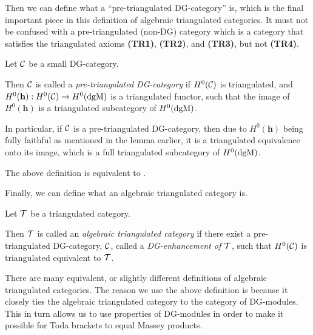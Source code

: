 Then we can define what a ``pre-triangulated DG-category'' is, which is the final important piece in this definition of algebraic triangulated categories. It must not be confused with a pre-triangulated (non-DG) category which is a category that satisfies the triangulated axioms {\bf (TR1)}, {\bf (TR2)}, and {\bf (TR3)}, but not {\bf (TR4)}.
\begin{definition}
    \label{def:pre-tri_dg_cat}
    Let \( {\mathcal{C}} \) be a small DG-category.

    Then \( {\mathcal{C}} \) is called a \emph{pre-triangulated DG-category} if \( H^0({\mathcal{C}}) \) is triangulated, and \( H^0(\mathbf{h}): H^0({\mathcal{C}}) \to H^0(\operatorname{dgM}) \) is a triangulated functor, such that the image of \( H^0(\mathbf{h}) \) is a triangulated subcategory of \( H^0(\operatorname{dgM}) \).
\end{definition}
In particular, if \( {\mathcal{C}} \) is a pre-triangulated DG-category, then due to \( H^0(\mathbf{h}) \) being fully faithful as mentioned in the lemma earlier, it is a triangulated equivalence onto its image, which is a full triangulated subcategory of \( H^0(\operatorname{dgM}) \).

The above definition is equivalent to \cite[Definition 3.1.1]{Jasso-Muro_2023}.

Finally, we can define what an algebraic triangulated category is.
\begin{definition}
    \label{def:alg_tri_cat}
    Let \( {\mathcal{T}} \) be a triangulated category.

    Then \( {\mathcal{T}} \) is called an \emph{algebraic triangulated category} if there exist a pre-triangulated DG-category, \( {\mathcal{C}} \), called a \emph{DG-enhancement of \( {\mathcal{T}} \)}, such that \( H^0({\mathcal{C}}) \) is triangulated equivalent to \( {\mathcal{T}} \).
\end{definition}

There are many equivalent, or slightly different definitions of algebraic triangulated categories. The reason we use the above definition is because it closely ties the algebraic triangulated category to the category of DG-modules. This in turn allows us to use properties of DG-modules in order to make it possible for Toda brackets to equal Massey products.

